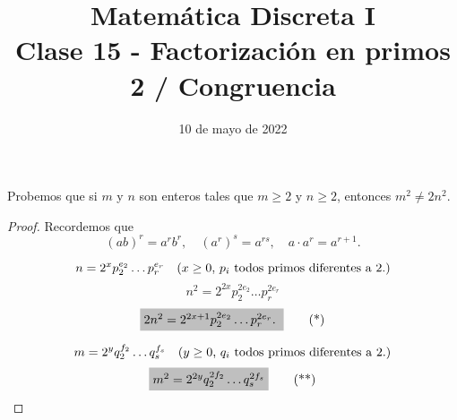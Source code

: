 \documentclass[handout]{beamer} %
\title[Clase 15 - Factorización en primos]{Matemática Discreta I \\ Clase 15 - Factorización en primos 2 / Congruencia}
\institute[]{\normalsize FAMAF / UNC
    \\[\baselineskip] ${}^{}$
    \\[\baselineskip]
}
\date[10/05/2022]{10 de mayo de 2022}
\begin{document}
    
    \frame{\titlepage} 
    
    
    \begin{frame}
        
        \begin{ejemplo} Probemos que si $m$ y $n$ son enteros tales que
            $m\ge 2$ y $n\ge 2$, entonces $m^2 \not=2n^2$.
        \end{ejemplo}\pause
        \begin{proof} \pause

        Recordemos que
        $$
        (ab)^r = a^rb^r, \quad (a^r)^s = a^{r s}, \quad  a\cdot a^r = a^{r+1}. 
        $$    


            $$ n = 2^{x}p_2^{e_2}\ldots p_r^{e_r}\text{\quad ($x \ge 0$, $p_i$ todos primos diferentes a 2.)} $$
            $$ n^2 = 2^{2x}p_2^{2e_2}\ldots p_r^{2e_r}$$
            \begin{equation}
                \colorbox{lightgray}{$2n^2= 2^{2x+1}p_2^{2e_2}\ldots p_r^{2e_r}.$ }\tag{*}
            \end{equation}
            
            $$
            m = 2^{y}q_2^{f_2}\ldots q_s^{f_s}\text{\quad ($y \ge 0$, $q_i$ todos primos diferentes a 2.)}
            $$
            \begin{equation}
                \colorbox{lightgray}{$m^2 = 2^{2y}q_2^{2f_2}\ldots q_s^{2f_s}$} \tag{**}
            \end{equation}
            
        \end{proof}
        
    \end{frame}
    
\end{document}
